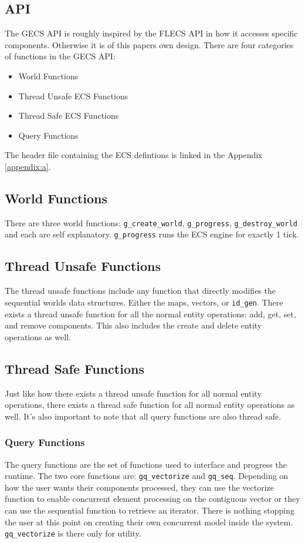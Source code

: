 \subsection{API}
The GECS API is roughly inspired by the FLECS API in how it accesses specific components. Otherwise it is of this papers own design. There are four categories of functions in the GECS API:
\begin{itemize}
    \item World Functions
    \item Thread Unsafe ECS Functions
    \item Thread Safe ECS Functions
    \item Query Functions
\end{itemize}

The header file containing the ECS defintions is linked in the Appendix \ref{appendix:a}.

\subsection{World Functions}
There are three world functions: \texttt{g\_create\_world}, \texttt{g\_progress}, \texttt{g\_destroy\_world} and each are self explanatory. \texttt{g\_progress} runs the ECS engine for exactly 1 tick.

\subsection{Thread Unsafe Functions}
The thread unsafe functions include any function that directly modifies the sequential worlds data structures. Either the maps, vectors, or \texttt{id\_gen}. There exists a thread unsafe function for all the normal entity operations: add, get, set, and remove components. This also includes the create and delete entity operations as well.  

\subsection{Thread Safe Functions}
Just like how there exists a thread unsafe function for all normal entity operations, there exists a thread safe function for all normal entity operations as well. It's also important to note that all query functions are also thread safe.

\subsubsection{Query Functions}
The query functions are the set of functions used to interface and progress the runtime. The two core functions are: \texttt{gq\_vectorize} and \texttt{gq\_seq}. Depending on how the user wants their components processed, they can use the vectorize function to enable concurrent element processing on the contiguous vector or they can use the sequential function to retrieve an iterator. There is nothing stopping the user at this point on creating their own concurrent model inside the system. \texttt{gq\_vectorize} is there only for utility.

